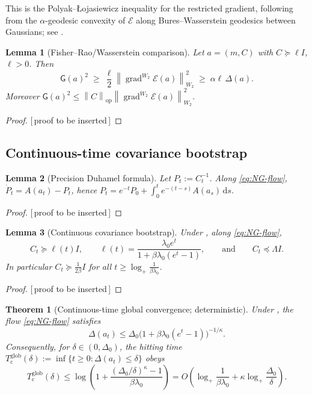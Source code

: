 \documentclass[11pt]{article}
\theoremstyle{plain}
\newtheorem{theorem}{Theorem}[section]
\newtheorem{lemma}[lemma]{Lemma}
\theoremstyle{definition}
\theoremstyle{remark}
\newcommand{\Id}{I}
\newcommand{\dd}{\mathrm{d}}
\newcommand{\grad}{\operatorname{grad}}
\newcommand{\op}{\mathrm{op}}
\newcommand{\calE}{\mathcal{E}}
\newcommand{\norm}[1]{\left\lVert #1\right\rVert}
\newcommand{\logp}{\log_+}
\newcommand{\glob}{\mathrm{glob}}
\newcommand{\Gradnorm}{\mathsf{G}}
\newcommand{\PROOFHOLE}{{\color{red}\textsf{[\,proof to be inserted\,]}}}
\begin{document}
This is the Polyak--{\L}ojasiewicz inequality for the restricted gradient, following from the
$\alpha$-geodesic convexity of $\calE$ along Bures--Wasserstein geodesics between Gaussians; see
\citet{lambert2022variational,diao2023forward}.

\begin{lemma}[Fisher--Rao/Wasserstein comparison]
\label{lem:FR-W2}
Let $a=(m,C)$ with $C\succeq\ell\Id$, $\ell>0$. Then
\begin{equation}
\label{eq:FR-W2}
    \boxed{\;
    \Gradnorm(a)^2
    \;\geq\;
    \frac{\ell}{2}\norm{\grad^{W_2}\calE(a)}_{W_2}^2
    \;\geq\;
    \alpha\ell\,\Delta(a).
    \;}
\end{equation}
Moreover $\Gradnorm(a)^2\leq\norm{C}_\op\norm{\grad^{W_2}\calE(a)}_{W_2}^2$.
\end{lemma}

\begin{proof}
\PROOFHOLE
\end{proof}

\subsection{Continuous-time covariance bootstrap}
\label{sec:cont}

\begin{lemma}[Precision Duhamel formula]
\label{lem:precision-duhamel}
Let $P_t:=C_t^{-1}$. Along \eqref{eq:NG-flow},
$\dot P_t=A(a_t)-P_t$, hence $P_t=e^{-t}P_0+\int_0^te^{-(t-s)}A(a_s)\,\dd s$.
\end{lemma}

\begin{proof}
\PROOFHOLE
\end{proof}

\begin{lemma}[Continuous covariance bootstrap]
\label{lem:cont-cov}
Under , along \eqref{eq:NG-flow},
\begin{equation}
\label{eq:ell-t}
    C_t\succeq\ell(t)\Id,
    \qquad
    \ell(t)=\frac{\lambda_0e^t}{1+\beta\lambda_0(e^t-1)},
    \qquad\text{and}\qquad
    C_t\preceq\Lambda\Id .
\end{equation}
In particular $C_t\succeq\tfrac1{2\beta}\Id$ for all $t\geq\logp\frac1{\beta\lambda_0}$.
\end{lemma}

\begin{proof}
\PROOFHOLE
\end{proof}

\begin{theorem}[Continuous-time global convergence; deterministic]
\label{thm:cont-global}
Under , the flow \eqref{eq:NG-flow} satisfies
\[
    \boxed{\;
    \Delta(a_t)\leq\Delta_0\bigl(1+\beta\lambda_0(e^t-1)\bigr)^{-1/\kappa}.
    \;}
\]
Consequently, for $\delta\in(0,\Delta_0)$, the hitting time
$T_{\mathrm c}^{\glob}(\delta):=\inf\{t\geq0:\Delta(a_t)\leq\delta\}$ obeys
\[
    T_{\mathrm c}^{\glob}(\delta)
    \leq\log\!\left(1+\frac{(\Delta_0/\delta)^{\kappa}-1}{\beta\lambda_0}\right)
    =O\!\left(\logp\frac1{\beta\lambda_0}+\kappa\logp\frac{\Delta_0}{\delta}\right).
\]
\end{theorem}
\end{document}
